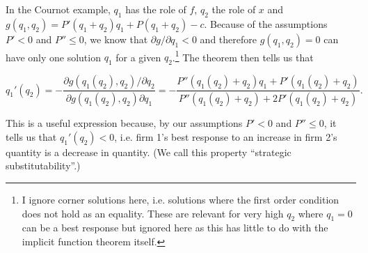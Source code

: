 \documentclass[a4paper,12pt]{article}
\begin{document}
In the Cournot example, $q_1$ has the role of $f$, $q_2$ the role of $x$ and $g(q_1,q_2)= P'(q_1+q_2)q_1+P(q_1+q_2)-c$. Because of the assumptions $P'<0$ and $P''\leq 0$, we know that $\partial g/\partial q_1<0$ and therefore $g(q_1,q_2)=0$ can have only one solution $q_1$ for a given $q_2$.\footnote{I ignore corner solutions here, i.e. solutions where the first order condition does not hold as an equality. These are relevant for very high $q_2$ where $q_1=0$ can be a best response but ignored here as this has little to do with the implicit function theorem itself.} The theorem then tells us that

\begin{equation*}
   q_1'(q_2)=-\frac{\partial g(q_1(q_2),q_2)/\partial q_2}{\partial g(q_1(q_2),q_2)\partial q_1}=-\frac{P''(q_1(q_2)+q_2)q_1+P'(q_1(q_2)+q_2)}{P''(q_1(q_2)+q_2)+2P'(q_1(q_2)+q_2)}.
\end{equation*}

This is a useful expression because, by our assumptions $P'<0$ and $P''\leq0$, it tells us that $q_1'(q_2)<0$, i.e. firm 1's best response to an increase in firm 2's quantity is a decrease in quantity. (We call this property ``strategic substitutability''.)
\end{document}
